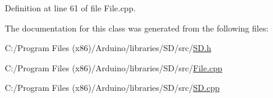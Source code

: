 Definition at line 61 of file File.\+cpp.



The documentation for this class was generated from the following files\+:\begin{DoxyCompactItemize}
\item 
C\+:/\+Program Files (x86)/\+Arduino/libraries/\+S\+D/src/\hyperlink{_s_d_8h}{S\+D.\+h}\item 
C\+:/\+Program Files (x86)/\+Arduino/libraries/\+S\+D/src/\hyperlink{_file_8cpp}{File.\+cpp}\item 
C\+:/\+Program Files (x86)/\+Arduino/libraries/\+S\+D/src/\hyperlink{_s_d_8cpp}{S\+D.\+cpp}\end{DoxyCompactItemize}
